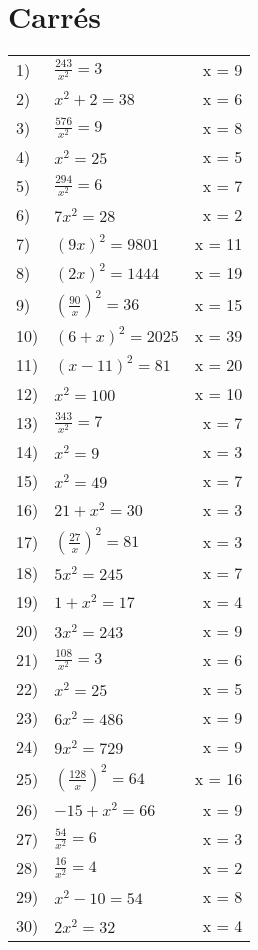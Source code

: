 \documentclass{article}
\begin{document}
\section{Carrés}

\begin{longtable}{l p{} r}
1) & $\frac{ 243 }{ { x }^2 } = 3$ & x = 9 \\ 
2) & ${ x }^2 + 2 = 38$ & x = 6 \\ 
3) & $\frac{ 576 }{ { x }^2 } = 9$ & x = 8 \\ 
4) & ${ x }^2 = 25$ & x = 5 \\ 
5) & $\frac{ 294 }{ { x }^2 } = 6$ & x = 7 \\ 
6) & $7{ x }^2 = 28$ & x = 2 \\ 
7) & ${ (9x) }^2 = 9801$ & x = 11 \\ 
8) & ${ (2x) }^2 = 1444$ & x = 19 \\ 
9) & ${ (\frac{ 90 }{ x }) }^2 = 36$ & x = 15 \\ 
10) & ${ (6 + x) }^2 = 2025$ & x = 39 \\ 
11) & ${ (x - 11) }^2 = 81$ & x = 20 \\ 
12) & ${ x }^2 = 100$ & x = 10 \\ 
13) & $\frac{ 343 }{ { x }^2 } = 7$ & x = 7 \\ 
14) & ${ x }^2 = 9$ & x = 3 \\ 
15) & ${ x }^2 = 49$ & x = 7 \\ 
16) & $21 + { x }^2 = 30$ & x = 3 \\ 
17) & ${ (\frac{ 27 }{ x }) }^2 = 81$ & x = 3 \\ 
18) & $5{ x }^2 = 245$ & x = 7 \\ 
19) & $1 + { x }^2 = 17$ & x = 4 \\ 
20) & $3{ x }^2 = 243$ & x = 9 \\ 
21) & $\frac{ 108 }{ { x }^2 } = 3$ & x = 6 \\ 
22) & ${ x }^2 = 25$ & x = 5 \\ 
23) & $6{ x }^2 = 486$ & x = 9 \\ 
24) & $9{ x }^2 = 729$ & x = 9 \\ 
25) & ${ (\frac{ 128 }{ x }) }^2 = 64$ & x = 16 \\ 
26) & $-15 + { x }^2 = 66$ & x = 9 \\ 
27) & $\frac{ 54 }{ { x }^2 } = 6$ & x = 3 \\ 
28) & $\frac{ 16 }{ { x }^2 } = 4$ & x = 2 \\ 
29) & ${ x }^2 - 10 = 54$ & x = 8 \\ 
30) & $2{ x }^2 = 32$ & x = 4 
\end{longtable}
\end{document}
